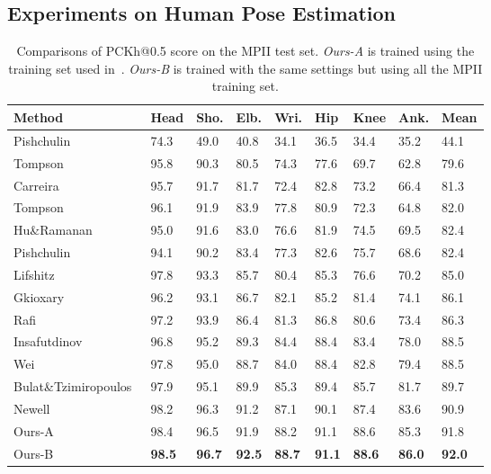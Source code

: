 \documentclass[10pt,twocolumn,letterpaper]{article}
\begin{document}
\subsection{Experiments on Human Pose Estimation}
\begin{table}
	\begin{footnotesize}
		\centering
		\caption{ Comparisons of PCKh@0.5 score on the MPII test set. 
			\textit{Ours-A} is trained using the training set used in~\cite{tompson2015efficient}. 
			\textit{Ours-B} is trained with the same settings but using all the MPII training set.  
}
		\begin{tabular} 
			{@{}p{2.6cm}p{0.3cm}p{0.3cm}p{0.3cm}p{0.3cm}p{0.3cm}p{0.3cm}p{0.3cm}p{0.5cm}}
			\hline
			Method & Head & Sho. & Elb. & Wri. & Hip & Knee & Ank. & Mean\\
			\hline
			Pishchulin \etal~\cite{pishchulin2013strong} & 74.3  & 49.0  & 40.8  & 34.1  & 36.5  & 34.4 & 35.2 & 44.1  \\
			Tompson \etal~\cite{tompson2014joint}& 95.8  & 90.3  & 80.5  & 74.3  & 77.6  & 69.7 & 62.8 & 79.6  \\
			Carreira \etal~\cite{carreira2016human} & 95.7  & 91.7  & 81.7  & 72.4  & 82.8  & 73.2 & 66.4 & 81.3  \\
			Tompson \etal~\cite{tompson2015efficient}& 96.1  & 91.9  & 83.9  & 77.8  & 80.9  & 72.3 & 64.8 & 82.0  \\
			Hu\&Ramanan~\cite{hu2016bottom} & 95.0  & 91.6  & 83.0  & 76.6  & 81.9  & 74.5 & 69.5 & 82.4  \\
			Pishchulin \etal~\cite{pishchulin2016deepcut} & 94.1  & 90.2  & 83.4  & 77.3  & 82.6  & 75.7 & 68.6 & 82.4   \\
			Lifshitz \etal~\cite{lifshitz2016human} & 97.8  & 93.3  & 85.7  & 80.4  & 85.3  & 76.6 & 70.2 & 85.0   \\
			Gkioxary \etal~\cite{gkioxari2016chained} & 96.2  & 93.1  & 86.7  & 82.1  & 85.2  & 81.4 & 74.1 & 86.1   \\
			Rafi \etal~\cite{rafi2016efficient} & 97.2  & 93.9  & 86.4  & 81.3  & 86.8  & 80.6 & 73.4 & 86.3   \\
			Insafutdinov \etal~\cite{insafutdinov2016deepercut} & 96.8  & 95.2  & 89.3  & 84.4  & 88.4  & 83.4 & 78.0 & 88.5   \\
			Wei \etal~\cite{wei2016convolutional} & 97.8  & 95.0  & 88.7  & 84.0  & 88.4  & 82.8 & 79.4 & 88.5   \\
			Bulat\&Tzimiropoulos~\cite{bulat2016human} & 97.9  & 95.1  & 89.9  & 85.3  & 89.4  & 85.7 & 81.7 & 89.7   \\
			Newell \etal~\cite{newell2016stacked} & 98.2  & 96.3  & 91.2  & 87.1  & 90.1  & 87.4 & 83.6 & 90.9   \\
\hline  
Ours-A& 98.4  & 96.5  & 91.9  & 88.2  & 91.1  & 88.6 & 85.3 & 91.8  \\
			Ours-B& \textbf{98.5}  &\textbf{96.7}  & \textbf{92.5}  & \textbf{88.7}  & \textbf{91.1}  & \textbf{88.6} &\textbf{86.0} & \textbf{92.0}  \\
			\hline
		\end{tabular}
		\label{tab:MPII}
	\end{footnotesize}
\end{table}
\end{document}
